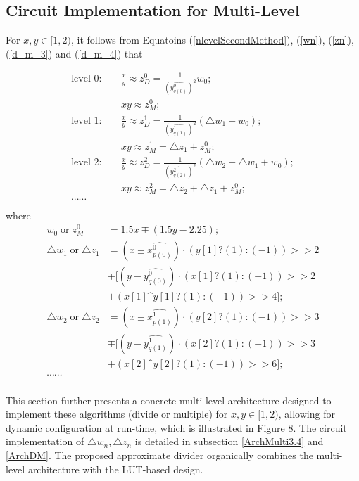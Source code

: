 \documentclass[conference]{IEEEtran}
\begin{document}
\subsection{Circuit Implementation for Multi-Level}
\label{Circuit5.1}
For $x, y \in [1,2)$, it follows from Equatoins (\ref{nlevelSecondMethod}), (\ref{wn}), (\ref{zn}), (\ref{d_m_3}) and (\ref{d_m_4}) that

\begin{align*}
\text{level }0:\quad & \frac{x}{y}\approx z_{D}^{0}=\frac1{(\widehat{y^{0}_{q(0)}})^2} w_{0};\\[3pt]
&xy\approx z_{M}^{0};\\[3pt]
\text{level }1:\quad & \frac{x}{y}\approx z_{D}^{1}=\frac{1}{(\widehat{y^{1}_{q(1)}})^2} (\triangle w_{1}+w_{0});\\[3pt]
&xy\approx z_{M}^{1}=\triangle z_{1}+z_{M}^{0};\\[3pt]
\text{level }2:\quad & \frac{x}{y}\approx z_{D}^{2}=\frac{1}{(\widehat{y^{2}_{q(2)}})^2} (\triangle w_{2}+\triangle w_{1}+w_{0});\\[3pt]
&xy\approx z_{M}^{2}=\triangle z_{2}+\triangle z_{1}+z^{0}_{M};\\[3pt]
\cdots\cdots&\\[3pt]
\end{align*}
where 
\begin{align*}
w_{0} \;\text{or}\; z_{M}^{0}&=1.5x\mp(1.5y-2.25);\nonumber\\[3pt]
\triangle w_{1}\;\text{or}\;\triangle z_{1}&=(x\pm\widehat{x_{p(0)}^{0}})\cdot(y[1]?(1):(-1))>>2\nonumber\\[3pt]
&\mp[(y-\widehat{y_{q(0)}^{0}})\cdot(x[1]?(1):(-1))>>2\nonumber\\[3pt]
&+(x[1]\text{\textasciicircum} y[1]?(1):(-1))>>4];\nonumber\\[3pt]
\triangle w_{2}\;\text{or}\;\triangle z_{2}&=(x\pm\widehat{x_{p(1)}^{1}})\cdot(y[2]?(1):(-1))>>3\nonumber\\[3pt]
&\mp[(y-\widehat{y_{q(1)}^{1}})\cdot(x[2]?(1):(-1))>>3\nonumber\\[3pt]
&+(x[2]\text{\textasciicircum} y[2]?(1):(-1))>>6];\nonumber\\[3pt]
\cdots\cdots&\nonumber\\[3pt]
\end{align*}

This section further presents a concrete multi-level architecture designed to implement these
algorithms (divide or multiple) for $x, y\in [1, 2)$, allowing for dynamic configuration at run-time, which is illustrated in Figure 8. The circuit implementation of 
\(\triangle w_n,  \triangle z_{n}\) is detailed in subsection \ref{ArchMulti3.4} and \ref{ArchDM}. The proposed approximate divider organically combines the multi-level architecture with the LUT-based design.
\end{document}
